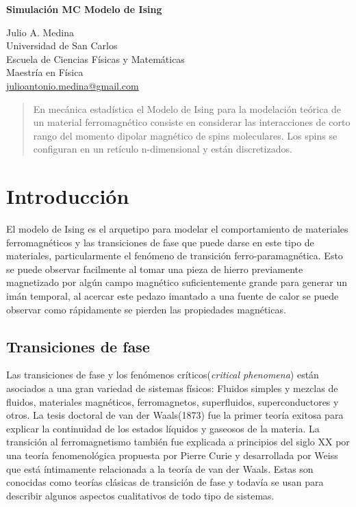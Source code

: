 \documentclass[a4paper]{article}
\begin{document}

\Large
 \begin{center}
\textbf{Simulación MC Modelo de Ising}\


\hspace{10pt}

\large
Julio A. Medina \\
\hspace{10pt}
\small  
 Universidad de San Carlos\\
Escuela de Ciencias Físicas y Matemáticas\\
Maestría en Física\\
\href{mailto:julioantonio.medina@gmail.com}{julioantonio.medina@gmail.com}\\

\end{center}

\hspace{10pt}

\begin{abstract}
En mecánica estadística el Modelo de Ising para la modelación teórica de un material ferromagnético consiste en considerar las interacciones de corto rango del momento dipolar magnético de spins moleculares. Los spins se configuran en un retículo n-dimensional y están discretizados. 

\end{abstract}

\normalsize
\section{Introducción}
El modelo de Ising es el arquetipo para modelar el comportamiento de materiales ferromagnéticos y las transiciones de fase que puede darse en este tipo de materiales, particularmente el fenómeno de transición ferro-paramagnética. Esto se puede observar facilmente al tomar una pieza de hierro previamente magnetizado por algún campo magnético suficientemente grande para generar un imán temporal, al acercar este pedazo imantado a una fuente de calor se puede observar como rápidamente se pierden las propiedades magnéticas.
\subsection{Transiciones de fase}
Las transiciones de fase y los fenómenos críticos(\textit{critical phenomena}) están asociados a una gran variedad de sistemas físicos: Fluidos simples y mezclas de fluidos, materiales magnéticos, ferromagnetos, superfluidos, superconductores y otros. La tesis doctoral de van der Waals(1873) fue la primer teoría exitosa para explicar la continuidad de los estados líquidos y gaseosos de la materia. La transición al ferromagnetismo también fue explicada a principios del siglo XX por una teoría fenomenológica propuesta por Pierre Curie y desarrollada por Weiss que está íntimamente relacionada a la teoría de van der Waals. Estas son conocidas como teorías clásicas de transición de fase y todavía se usan para describir algunos aspectos cualitativos de todo tipo de sistemas.\\
\end{document}
